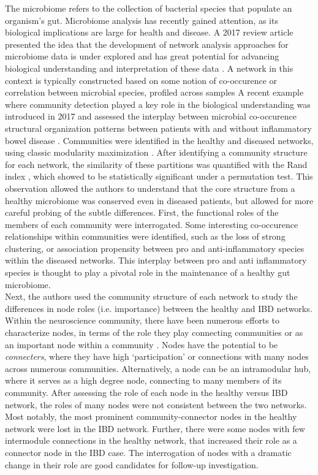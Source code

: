 \indent The microbiome refers to the collection of bacterial species that populate an organism's gut. Microbiome analysis has recently gained attention, as its biological implications are large for health and disease. A 2017 review article presented the idea that the development of network analysis approaches for microbiome data is under explored and has great potential for advancing biological understanding and interpretation of these data \cite{networkMicrobiome}. A network in this context is typically constructed based on some notion of co-occurence or correlation between microbial species, profiled across samples A recent example where community detection played a key role in the biological understanding was introduced in 2017 and assessed the interplay between microbial co-occurence structural organization patterns between patients with and without inflammatory bowel disease \cite{moduleMicrobiome}. Communities were identified in the healthy and diseased networks, using classic modularity maximization \cite{girvancommunity}. After identifying a community structure for each network, the similarity of these partitions was quantified with the Rand index \cite{Rand}, which showed to be statistically significant under a permutation test. This observation allowed the authors to understand that the core structure from a healthy microbiome was conserved even in diseased patients, but allowed for more careful probing of the subtle differences. First, the functional roles of the members of each community were interrogated. Some interesting co-occurence relationships within communities were identified, such as the loss of strong clustering, or association propensity between pro and anti-inflammatory species within the diseased networks. This interplay between pro and anti inflammatory species is thought to play a pivotal role in the maintenance of a healthy gut microbiome. \\
\indent Next, the authors used the community structure of each network to study the differences in node roles (i.e. importance) between the healthy and IBD networks. Within the neuroscience community, there have been numerous efforts to characterize nodes, in terms of the role they play connecting communities or as an important node within a community \cite{hub}. Nodes have the potential to be \emph{connecters}, where they have high `participation' or connections with many nodes across numerous communities. Alternatively, a node can be an intramodular hub, where it serves as a high degree node, connecting to many members of its community. After assessing the role of each node in the healthy versus IBD network, the roles of many nodes were not consistent between the two networks. Most notably, the most prominent community-connector nodes in the healthy network were lost in the IBD network. Further, there were some nodes with few intermodule connections in the healthy network, that increased their role as a connector node in the IBD case. The interrogation of nodes with a dramatic change in their role are good candidates for follow-up investigation. \\
